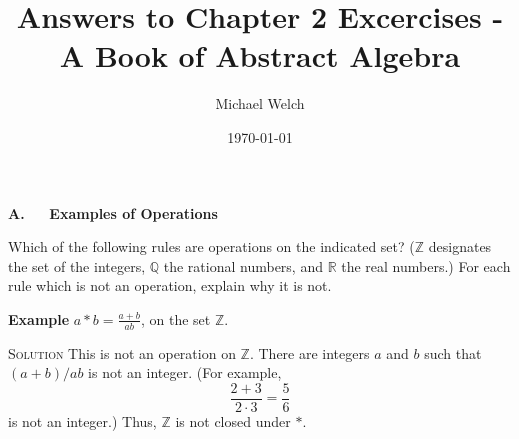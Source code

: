 \documentclass[twoside]{amsart}
\newcommand{\Rationals}{\mathbb{Q}{}}
\newcommand{\Reals}{\mathbb{R}{}}
\newcommand{\Integers}{\mathbb{Z}{}}
\newcommand{\Solution}{\textsc{Solution}\xspace}
\newcommand{\brk}{\vspace{5pt}}
\newcommand{\noindsol}{\noindent\Solution}
\begin{document}
\title[Answers to Chapter 2 Exercises]{Answers to Chapter 2 Excercises
  - A Book of Abstract Algebra} 
\author{Michael Welch}
\date{\today}
\maketitle


\noindent\large\textbf{A. $\quad$ Examples of Operations} 

\brk \noindent Which of the following rules are operations on the
indicated set?  ($\Integers$ designates the set of the integers,
$\Rationals$ the rational numbers, and $\Reals$ the real numbers.)
For each rule which is not an operation, explain why it is not.

\brk \noindent \textbf{Example} $a * b = \displaystyle \frac{a +
  b}{ab}$, on the set $\Integers$.

\brk \noindsol This is not an operation on $\Integers$. There are
integers $a$ and $b$ such that $(a+b)/ab$ is not an integer. (For
example,
% 
\[
\frac{2+3}{2 \cdot 3} = \frac{5}{6}
\]
% 
is not an integer.) Thus, $\Integers$ is not closed under $*$.
\end{document}
